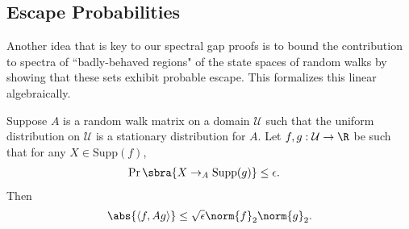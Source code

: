 \subsection{Escape Probabilities}
Another idea that is key to our spectral gap proofs is to bound the contribution to spectra of ``badly-behaved regions" of the state spaces of random walks by showing that these sets exhibit probable escape. This  formalizes this linear algebraically.
\begin{lemma}\label{lem:escape probs}
    Suppose $A$ is a random walk matrix on a domain $\mathcal{U}$ such that the uniform distribution on $\mathcal{U}$ is a stationary distribution for $A$. Let $f,g:\mathcal{U}\to\R$ be such that for any $X\in \mathrm{Supp}(f)$,    
    \begin{align*}
        \Pr\sbra{X\to_{A}\mathrm{Supp}(g)}&\leq \epsilon.
    \end{align*}
    Then
    \begin{align*}
         \abs{\left\langle f,Ag\right\rangle} \leq \sqrt\epsilon\norm{f}_2\norm{g}_2.
    \end{align*}
\end{lemma}
